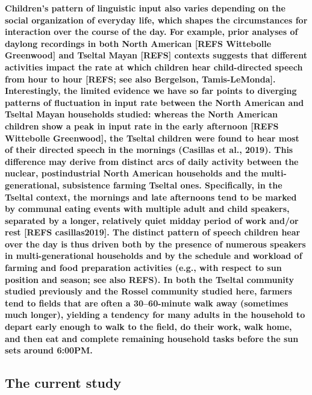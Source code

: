 \documentclass[,man,floatsintext]{apa6}
\begin{document}
\textbf{Children's pattern of linguistic input also varies depending on
the social organization of everyday life, which shapes the circumstances
for interaction over the course of the day. For example, prior analyses
of daylong recordings in both North American {[}REFS Wittebolle
Greenwood{]} and Tseltal Mayan {[}REFS{]} contexts suggests that
different activities impact the rate at which children hear
child-directed speech from hour to hour {[}REFS; see also Bergelson,
Tamis-LeMonda{]}. Interestingly, the limited evidence we have so far
points to diverging patterns of fluctuation in input rate between the
North American and Tseltal Mayan households studied: whereas the North
American children show a peak in input rate in the early afternoon
{[}REFS Wittebolle Greenwood{]}, the Tseltal children were found to hear
most of their directed speech in the mornings (Casillas et al., 2019).
This difference may derive from distinct arcs of daily activity between
the nuclear, postindustrial North American households and the
multi-generational, subsistence farming Tseltal ones. Specifically, in
the Tseltal context, the mornings and late afternoons tend to be marked
by communal eating events with multiple adult and child speakers,
separated by a longer, relatively quiet midday period of work and/or
rest {[}REFS casillas2019{]}. The distinct pattern of speech children
hear over the day is thus driven both by the presence of numerous
speakers in multi-generational households and by the schedule and
workload of farming and food preparation activities (e.g., with respect
to sun position and season; see also REFS). In both the Tseltal
community studied previously and the Rossel community studied here,
farmers tend to fields that are often a 30--60-minute walk away
(sometimes much longer), yielding a tendency for many adults in the
household to depart early enough to walk to the field, do their work,
walk home, and then eat and complete remaining household tasks before
the sun sets around 6:00PM.}

\subsection{The current study}\label{the-current-study}
\end{document}
